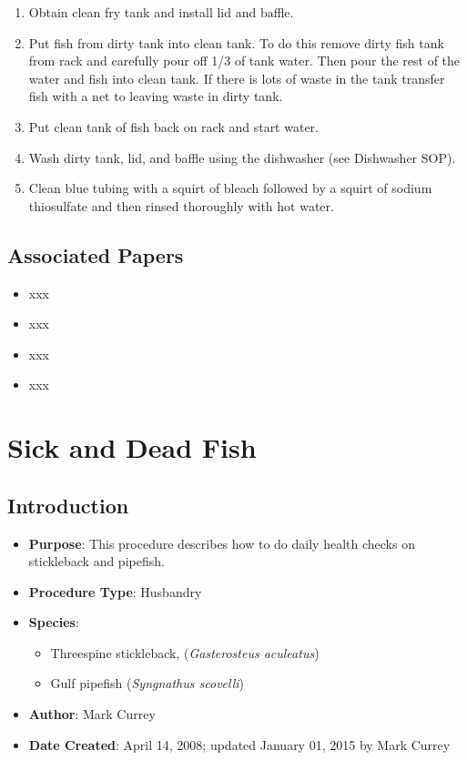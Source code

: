 \documentclass[
  letterpaper,
  DIV=11,
  numbers=noendperiod]{scrreprt}
\providecommand{\tightlist}{%
  \setlength{\itemsep}{0pt}\setlength{\parskip}{0pt}}\usepackage{longtable,booktabs,array}
\begin{document}
\begin{enumerate}
\def\labelenumi{\arabic{enumi}.}
\tightlist
\item
  Obtain clean fry tank and install lid and baffle.
\item
  Put fish from dirty tank into clean tank. To do this remove dirty fish
  tank from rack and carefully pour off 1/3 of tank water. Then pour the
  rest of the water and fish into clean tank. If there is lots of waste
  in the tank transfer fish with a net to leaving waste in dirty tank.
\item
  Put clean tank of fish back on rack and start water.
\item
  Wash dirty tank, lid, and baffle using the dishwasher (see Dishwasher
  SOP).
\item
  Clean blue tubing with a squirt of bleach followed by a squirt of
  sodium thiosulfate and then rinsed thoroughly with hot water.
\end{enumerate}

\hypertarget{associated-papers-21}{%
\section{Associated Papers}\label{associated-papers-21}}

\begin{itemize}
\tightlist
\item
  xxx
\item
  xxx
\item
  xxx
\item
  xxx
\end{itemize}

\hypertarget{sec-husbandry-fish_health_check}{%
\chapter{Sick and Dead Fish}\label{sec-husbandry-fish_health_check}}

\hypertarget{introduction-34}{%
\section{Introduction}\label{introduction-34}}

\begin{itemize}
\tightlist
\item
  \textbf{Purpose}: This procedure describes how to do daily health
  checks on stickleback and pipefish.
\item
  \textbf{Procedure Type}: Husbandry
\item
  \textbf{Species}:

  \begin{itemize}
  \tightlist
  \item
    Threespine stickleback, (\emph{Gasterosteus aculeatus})
  \item
    Gulf pipefish (\emph{Syngnathus scovelli})
  \end{itemize}
\item
  \textbf{Author}: Mark Currey
\item
  \textbf{Date Created}: April 14, 2008; updated January 01, 2015 by
  Mark Currey
\end{itemize}
\end{document}
